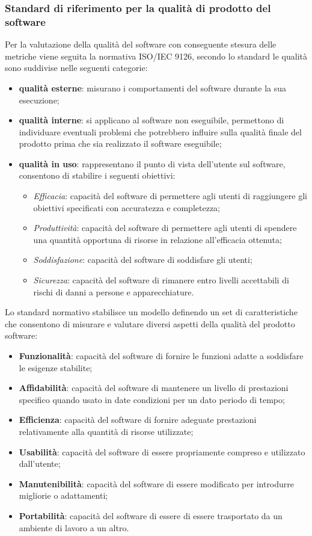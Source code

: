 \subsubsection{Standard di riferimento per la qualità di prodotto del software}
Per la valutazione della qualità del software con conseguente stesura delle metriche viene seguita la normativa ISO/IEC 9126, secondo lo standard le qualità sono suddivise nelle seguenti categorie:
\begin{itemize}
    \item \textbf{qualità esterne}: misurano i comportamenti del software durante la sua esecuzione;
    \item \textbf{qualità interne}: si applicano al software non eseguibile, permettono di individuare eventuali problemi che potrebbero influire sulla qualità finale del prodotto prima che sia realizzato il software eseguibile;
    \item \textbf{qualità in uso}: rappresentano il punto di vista dell'utente sul software, consentono di stabilire i seguenti obiettivi:
    \begin{itemize}
        \item \textit{Efficacia}: capacità del software di permettere agli utenti di raggiungere gli obiettivi specificati con accuratezza e completezza;
        \item \textit{Produttività}: capacità del software di permettere agli utenti di spendere una quantità opportuna di risorse in relazione all'efficacia ottenuta;
        \item \textit{Soddisfazione}: capacità del software di soddisfare gli utenti;
        \item \textit{Sicurezza}: capacità del software di rimanere entro livelli accettabili di rischi di danni a persone e apparecchiature.
    \end{itemize}
\end{itemize}
Lo standard normativo stabilisce un modello definendo un set di caratteristiche che consentono di misurare e valutare diversi aspetti della qualità del prodotto software:
\begin{itemize}
    \item \textbf{Funzionalità}: capacità del software di fornire le funzioni adatte a soddisfare le esigenze stabilite;
    \item \textbf{Affidabilità}: capacità del software di mantenere un livello di prestazioni specifico quando usato in date condizioni per un dato periodo di tempo;
    \item \textbf{Efficienza}: capacità del software di fornire adeguate prestazioni relativamente alla quantità di risorse utilizzate;
    \item \textbf{Usabilità}: capacità del software di essere propriamente compreso e utilizzato dall'utente;
    \item \textbf{Manutenibilità}: capacità del software di essere modificato per introdurre migliorie o adattamenti;
    \item \textbf{Portabilità}: capacità del software di essere di essere trasportato da un ambiente di lavoro a un altro.
\end{itemize}
